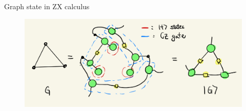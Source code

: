 \documentclass[aspectratio=169,xcolor=dvipsnames, t]{beamer}
\begin{document}
\begin{frame}{Graph state in ZX calculus}
    \begin{figure}
        \includegraphics[width=.95\textwidth]{figures/zx_graph_state.PNG}
    \end{figure}
\end{frame}
\end{document}
